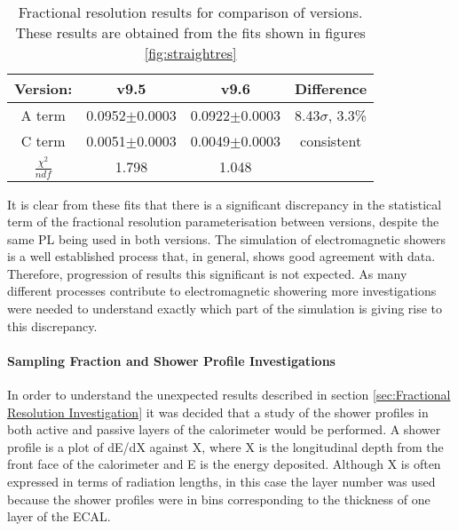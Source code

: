 \begin{table}[h]
  \centering
  \begin{tabular}{|c|c|c|c|}
      \hline
      Version: & v9.5 & v9.6 & Difference  \\ \hline
      A term    & 0.0952$\pm$0.0003 & 0.0922$\pm$0.0003  & 8.43$\sigma$, 3.3\% \\ \hline
      C term    & 0.0051$\pm$0.0003 & 0.0049$\pm$0.0003 & consistent \\ \hline
      $\frac{\chi^2}{ndf}$   &1.798  & 1.048 &  \\ \hline
  \end{tabular}
  \caption{Fractional resolution results for comparison of \geant versions.  These results are obtained from the fits shown in figures \ref{fig:straightres}}
  \label{tab:results}
\end{table}

It is clear from these fits that there is a significant discrepancy in the statistical term of the fractional resolution parameterisation between \geant versions, despite the same PL being used in both versions.  The simulation of electromagnetic showers is a well established process that, in general, shows good agreement with data.  Therefore, progression of results this significant is not expected.  As many different processes contribute to electromagnetic showering more investigations were needed to understand exactly which part of the simulation is giving rise to this discrepancy.

\paragraph{Sampling Fraction and Shower Profile Investigations}
\label{sec:Sampling Fraction and Shower Profile Investigations}
In order to understand the unexpected results described in section \ref{sec:Fractional Resolution Investigation} it was decided that a study of the shower profiles in both active and passive layers of the calorimeter would be performed.  A shower profile is a plot of dE/dX against X, where X is the longitudinal depth from the front face of the calorimeter and E is the energy deposited.  Although X is often expressed in terms of radiation lengths, in this case the layer number was used because the shower profiles were in bins corresponding to the thickness of one layer of the ECAL.

